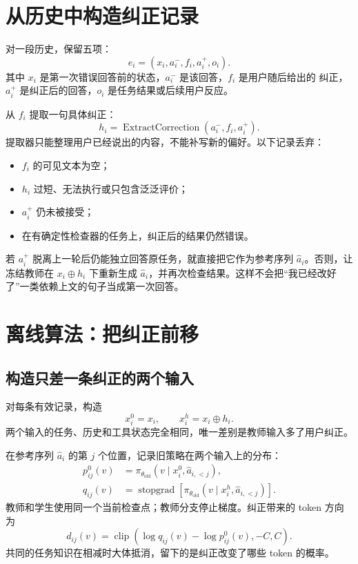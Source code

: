 \documentclass[11pt,UTF8,fontset=fandol]{ctexart}
\newcommand{\clip}{\operatorname{clip}}
\newcommand{\sg}{\operatorname{stopgrad}}
\begin{document}
\section{从历史中构造纠正记录}

对一段历史，保留五项：
\begin{equation}
  e_i=(x_i,a_i^{-},f_i,a_i^{+},o_i).
  \label{eq:record}
\end{equation}
其中 \(x_i\) 是第一次错误回答前的状态，\(a_i^{-}\) 是该回答，\(f_i\) 是用户随后给出的
纠正，\(a_i^{+}\) 是纠正后的回答，\(o_i\) 是任务结果或后续用户反应。

从 \(f_i\) 提取一句具体纠正：
\begin{equation}
  h_i=\operatorname{ExtractCorrection}
      (a_i^{-},f_i,a_i^{+}).
\end{equation}
提取器只能整理用户已经说出的内容，不能补写新的偏好。以下记录丢弃：
\begin{itemize}
  \item \(f_i\) 的可见文本为空；
  \item \(h_i\) 过短、无法执行或只包含泛泛评价；
  \item \(a_i^{+}\) 仍未被接受；
  \item 在有确定性检查器的任务上，纠正后的结果仍然错误。
\end{itemize}

若 \(a_i^{+}\) 脱离上一轮后仍能独立回答原任务，就直接把它作为参考序列
\(\widehat a_i\)。否则，让冻结教师在 \(x_i\oplus h_i\) 下重新生成
\(\widehat a_i\)，并再次检查结果。这样不会把``我已经改好了''一类依赖上文的句子当成第一次回答。

\section{离线算法：把纠正前移}

\subsection{构造只差一条纠正的两个输入}

对每条有效记录，构造
\begin{equation}
  x_i^{0}=x_i,\qquad
  x_i^{h}=x_i\oplus h_i.
\end{equation}
两个输入的任务、历史和工具状态完全相同，唯一差别是教师输入多了用户纠正。

在参考序列 \(\widehat a_i\) 的第 \(j\) 个位置，记录旧策略在两个输入上的分布：
\begin{align}
  p_{ij}^{0}(v)
    &=\pi_{\theta_{\mathrm{old}}}
      (v\mid x_i^{0},\widehat a_{i,<j}),\\
  q_{ij}(v)
    &=\sg\!\left[
      \pi_{\theta_{\mathrm{old}}}
      (v\mid x_i^{h},\widehat a_{i,<j})
      \right].
\end{align}
教师和学生使用同一个当前检查点；教师分支停止梯度。纠正带来的 token 方向为
\begin{equation}
  d_{ij}(v)
  =
  \clip\!\left(
    \log q_{ij}(v)-\log p_{ij}^{0}(v),-C,C
  \right).
  \label{eq:direction}
\end{equation}
共同的任务知识在相减时大体抵消，留下的是纠正改变了哪些 token 的概率。
\end{document}
